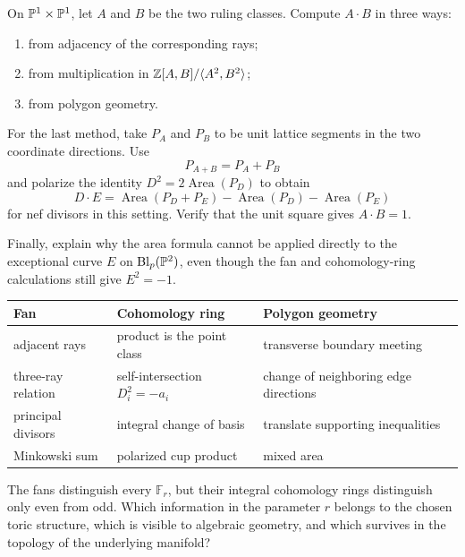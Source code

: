 \begin{enumerate}[label=\textbf{Hint \arabic*.},wide=0pt]
On \(\mathbb{P}^1\times\mathbb{P}^1\), let \(A\) and \(B\) be the two ruling
classes. Compute \(A\cdot B\) in three ways:
\begin{enumerate}[label=(\alph*),wide=0pt]
\item from adjacency of the corresponding rays;
\item from multiplication in
\(\mathbb{Z}[A,B]/\langle A^2,B^2\rangle\);
\item from polygon geometry.
\end{enumerate}
For the last method, take \(P_A\) and \(P_B\) to be unit lattice
segments in the two coordinate directions. Use
\[
P_{A+B}=P_A+P_B
\]
and polarize the identity \(D^2=2\operatorname{Area}(P_D)\) to obtain
\[
D\cdot E
=
\operatorname{Area}(P_D+P_E)
-\operatorname{Area}(P_D)
-\operatorname{Area}(P_E)
\]
for nef divisors in this setting. Verify that the unit square gives
\(A\cdot B=1\).

Finally, explain why the area formula cannot be applied directly to
the exceptional curve \(E\) on \(\operatorname{Bl}_p(\mathbb{P}^2)\), even though the fan
and cohomology-ring calculations still give \(E^2=-1\).

\end{enumerate}

\begin{threedictionaries}
\begin{center}
\small
\begin{tabularx}{\linewidth}{@{}
  >{\raggedright\arraybackslash}X
  >{\raggedright\arraybackslash}X
  >{\raggedright\arraybackslash}X@{}}
\toprule
\textbf{Fan}
& \textbf{Cohomology ring}
& \textbf{Polygon geometry}
\\
\midrule
adjacent rays
& product is the point class
& transverse boundary meeting
\\
three-ray relation
& self-intersection \(D_i^2=-a_i\)
& change of neighboring edge directions
\\
principal divisors
& integral change of basis
& translate supporting inequalities
\\
Minkowski sum
& polarized cup product
& mixed area
\\
\bottomrule
\end{tabularx}
\end{center}
\end{threedictionaries}

The fans distinguish every \(\mathbb F_r\), but their integral
cohomology rings distinguish only even from odd. Which information in
the parameter \(r\) belongs to the chosen toric structure, which is
visible to algebraic geometry, and which survives in the topology of
the underlying manifold?

